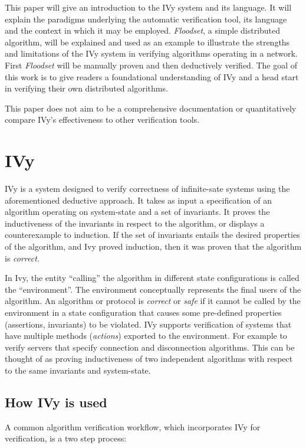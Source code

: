 \documentclass[fleqn]{article}
\begin{document}
  This paper will give an introduction to the IVy system and its language. It will explain the paradigms underlying the automatic verification tool, its language and the context in which it may be employed.  \textit{Floodset}, a simple distributed algorithm, will be explained and used as an example to illustrate the strengths and limitations of the IVy system in verifying algorithms operating in a network. First \textit{Floodset} will be manually proven and then deductively verified.  The goal of this work is to give readers a foundational understanding of IVy and a head start in verifying their own distributed algorithms.

  This paper does not aim to be a comprehensive documentation or quantitatively compare IVy's effectiveness to other verification tools.

\section{IVy}
IVy is a system designed to verify correctness of infinite-sate systems using the aforementioned deductive approach. It takes as input a specification of an algorithm operating on system-state  and a set of invariants. It proves the inductiveness of the invariants in respect to the algorithm, or displays a counterexample to induction. If the set of invariants entails the desired properties of the algorithm, and Ivy proved induction, then it was proven that the algorithm is \textit{correct}.

In Ivy, the entity ``calling'' the algorithm in different state configurations is called the ``environment''. The environment conceptually represents the final users of the algorithm. An algorithm or protocol is \textit{correct} or \textit{safe} if it cannot be called by the environment in a state configuration that causes some pre-defined properties (assertions, invariants) to be violated. IVy supports verification of systems that have multiple methods (\textit{actions}) exported to the environment. For example to verify servers that specify connection and disconnection algorithms. This can be thought of as proving inductiveness of two independent algorithms with respect to the same invariants and system-state.

\subsection{How IVy is used}

A common algorithm verification workflow, which incorporates IVy for verification, is a two step process:
\end{document}
